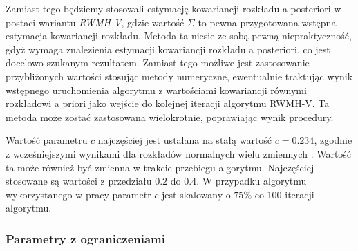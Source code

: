 Zamiast tego będziemy stosowali estymację kowariancji rozkładu a posteriori w postaci wariantu \emph{RWMH-V}, gdzie wartość $\Sigma$ to pewna przygotowana wstępna estymacja kowariancji rozkładu. Metoda ta niesie ze sobą pewną niepraktyczność, gdyż wymaga znalezienia estymacji kowariancji rozkładu a posteriori, co jest docelowo szukanym rezultatem. Zamiast tego możliwe jest zastosowanie przybliżonych wartości stosując metody numeryczne, ewentualnie traktując wynik wstępnego uruchomienia algorytmu z wartościami kowariancji równymi rozkładowi a priori jako wejście do kolejnej iteracji algorytmu RWMH-V. Ta metoda może zostać zastosowana wielokrotnie, poprawiając wynik procedury.

Wartość parametru $c$ najczęściej jest ustalana na stałą wartość $c = 0.234$, zgodnie z wcześniejszymi wynikami dla rozkładów normalnych wielu zmiennych \cite{herbst}. Wartość ta może również być zmienna w trakcie przebiegu algorytmu. Najczęściej stosowane są wartości z przedziału $0.2$ do $0.4$. W przypadku algorytmu wykorzystanego w pracy parametr $c$ jest skalowany o $75\%$ co 100 iteracji algorytmu. 

\subsubsection{Parametry z ograniczeniami}

